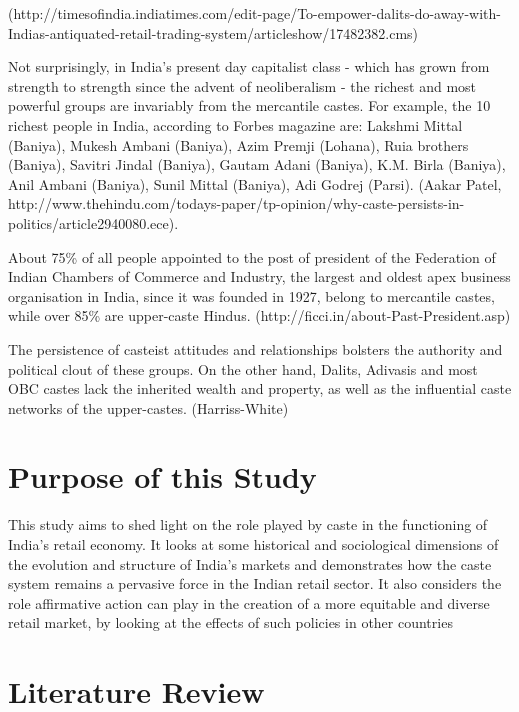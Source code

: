 \documentclass[12pt,a4paper,titlepage]{report}
\begin{document}
(http://timesofindia.indiatimes.com/edit-page/To-empower-dalits-do-away-with-Indias-antiquated-retail-trading-system/articleshow/17482382.cms)

Not surprisingly, in India's present day capitalist class - which has
grown from strength to strength since the advent of neoliberalism - the
richest and most powerful groups are invariably from the mercantile
castes. For example, the 10 richest people in India, according to Forbes
magazine are: Lakshmi Mittal (Baniya), Mukesh Ambani (Baniya), Azim
Premji (Lohana), Ruia brothers (Baniya), Savitri Jindal (Baniya), Gautam
Adani (Baniya), K.M. Birla (Baniya), Anil Ambani (Baniya), Sunil Mittal
(Baniya), Adi Godrej (Parsi). (Aakar Patel,
http://www.thehindu.com/todays-paper/tp-opinion/why-caste-persists-in-politics/article2940080.ece).

About 75\% of all people appointed to the post of president of the
Federation of Indian Chambers of Commerce and Industry, the largest and
oldest apex business organisation in India, since it was founded in
1927, belong to mercantile castes, while over 85\% are upper-caste
Hindus. (http://ficci.in/about-Past-President.asp)

The persistence of casteist attitudes and relationships bolsters the
authority and political clout of these groups. On the other hand,
Dalits, Adivasis and most OBC castes lack the inherited wealth and
property, as well as the influential caste networks of the upper-castes.
(Harriss-White)

\section{Purpose of this Study}\label{purpose-of-this-study}

This study aims to shed light on the role played by caste in the
functioning of India's retail economy. It looks at some historical and
sociological dimensions of the evolution and structure of India's
markets and demonstrates how the caste system remains a pervasive force
in the Indian retail sector. It also considers the role affirmative
action can play in the creation of a more equitable and diverse retail
market, by looking at the effects of such policies in other countries

\section{Literature Review}\label{literature-review}
\end{document}
